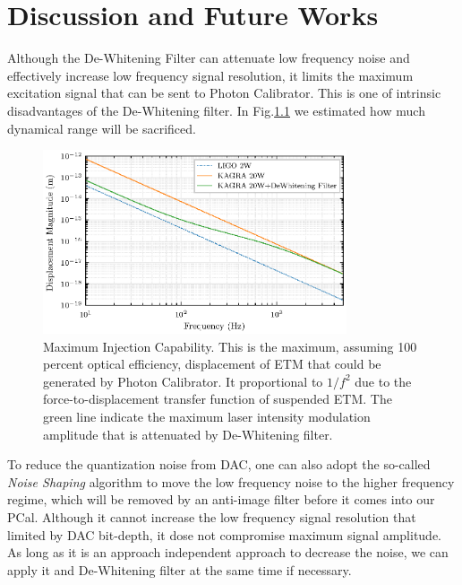 




\chapter{Discussion and Future Works}

Although the De-Whitening Filter can attenuate low frequency noise and effectively increase low frequency signal resolution, it limits the maximum excitation signal that can be sent to Photon Calibrator. This is one of intrinsic disadvantages of the De-Whitening filter. In Fig.\ref{fig:injcap} we estimated how much dynamical range will be sacrificed. 

\begin{figure}[hbt!]
\centering
\includegraphics[width=0.8\textwidth]{figure/20WdeW}
\caption[Maximum Injection Capability]{Maximum Injection Capability. This is the maximum, assuming 100 percent optical efficiency, displacement of ETM that could be generated by Photon Calibrator. It proportional to $1/f^2$ due to the force-to-displacement transfer function of suspended ETM. The green line indicate the maximum laser intensity modulation amplitude that is attenuated by De-Whitening filter.}
\label{fig:injcap}

\end{figure}

To reduce the quantization noise from DAC, one can also adopt the so-called \emph{Noise Shaping} algorithm \cite{dac:shaping} to move the low frequency noise to the higher frequency regime, which will be removed by an anti-image filter before it comes into our PCal. Although it cannot increase the low frequency signal resolution that limited by DAC bit-depth, it dose not compromise maximum signal amplitude. As long as it is an approach independent approach to decrease the noise, we can apply it and De-Whitening filter at the same time if necessary.

